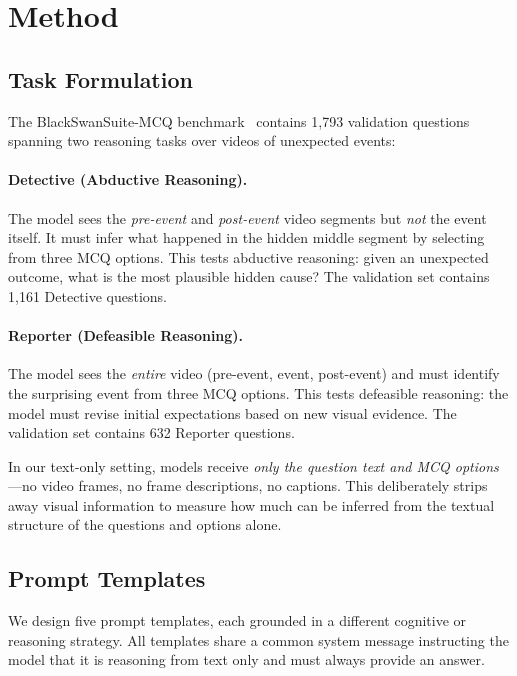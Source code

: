 \section{Method}
\label{sec:method}

\subsection{Task Formulation}
\label{sec:task}

The BlackSwanSuite-MCQ benchmark~\cite{chinchure2025black} contains 1{,}793 validation questions spanning two reasoning tasks over videos of unexpected events:

\paragraph{Detective (Abductive Reasoning).}
The model sees the \emph{pre-event} and \emph{post-event} video segments but \emph{not} the event itself.
It must infer what happened in the hidden middle segment by selecting from three MCQ options.
This tests abductive reasoning: given an unexpected outcome, what is the most plausible hidden cause?
The validation set contains 1{,}161 Detective questions.

\paragraph{Reporter (Defeasible Reasoning).}
The model sees the \emph{entire} video (pre-event, event, post-event) and must identify the surprising event from three MCQ options.
This tests defeasible reasoning: the model must revise initial expectations based on new visual evidence.
The validation set contains 632 Reporter questions.

In our text-only setting, models receive \emph{only the question text and MCQ options}---no video frames, no frame descriptions, no captions.
This deliberately strips away visual information to measure how much can be inferred from the textual structure of the questions and options alone.

\subsection{Prompt Templates}
\label{sec:templates}

We design five prompt templates, each grounded in a different cognitive or reasoning strategy.
All templates share a common system message instructing the model that it is reasoning from text only and must always provide an answer.

